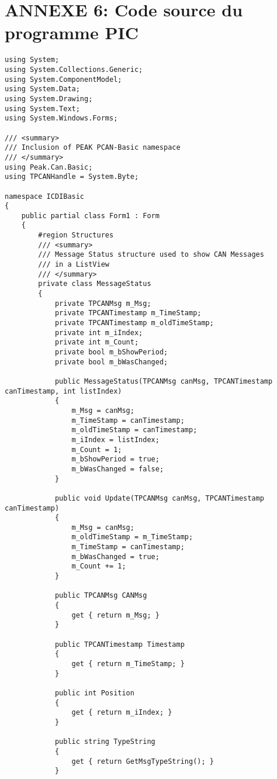 \section{ANNEXE 6: Code source du programme PIC}
\begin{lstlisting}
using System;
using System.Collections.Generic;
using System.ComponentModel;
using System.Data;
using System.Drawing;
using System.Text;
using System.Windows.Forms;

/// <summary>
/// Inclusion of PEAK PCAN-Basic namespace
/// </summary>
using Peak.Can.Basic;
using TPCANHandle = System.Byte;

namespace ICDIBasic
{
    public partial class Form1 : Form
    {
        #region Structures
        /// <summary>
        /// Message Status structure used to show CAN Messages
        /// in a ListView
        /// </summary>
        private class MessageStatus
        {
            private TPCANMsg m_Msg;
            private TPCANTimestamp m_TimeStamp;
            private TPCANTimestamp m_oldTimeStamp;
            private int m_iIndex;
            private int m_Count;
            private bool m_bShowPeriod;
            private bool m_bWasChanged;

            public MessageStatus(TPCANMsg canMsg, TPCANTimestamp canTimestamp, int listIndex)
            {
                m_Msg = canMsg;
                m_TimeStamp = canTimestamp;
                m_oldTimeStamp = canTimestamp;
                m_iIndex = listIndex;
                m_Count = 1;
                m_bShowPeriod = true;
                m_bWasChanged = false;
            }

            public void Update(TPCANMsg canMsg, TPCANTimestamp canTimestamp)
            {
                m_Msg = canMsg;
                m_oldTimeStamp = m_TimeStamp;
                m_TimeStamp = canTimestamp;
                m_bWasChanged = true;
                m_Count += 1;
            }

            public TPCANMsg CANMsg
            {
                get { return m_Msg; }
            }

            public TPCANTimestamp Timestamp
            {
                get { return m_TimeStamp; }
            }

            public int Position
            {
                get { return m_iIndex; }
            }

            public string TypeString
            {
                get { return GetMsgTypeString(); }
            }


\end{lstlisting}
